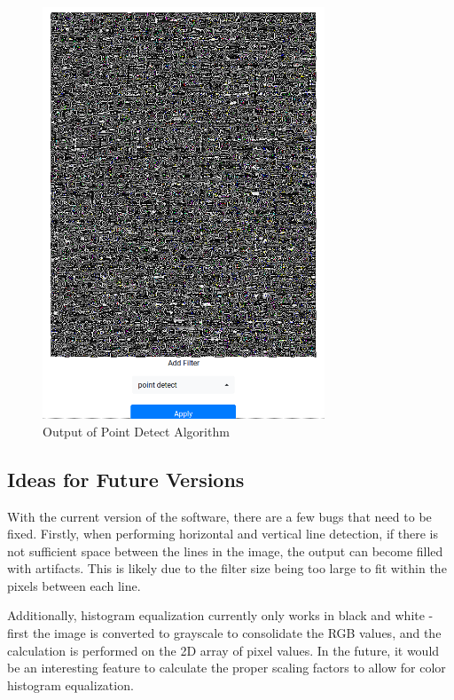 \documentclass{article}
\let\Oldsubsection\subsection
\renewcommand{\subsection}{\FloatBarrier\Oldsubsection}
\begin{document}
  \begin{figure}[!htb]
    \centering
    \includegraphics[width=0.75\textwidth]{assets/point_detect.png}
    \caption{Output of Point Detect Algorithm}
    \label{fig:point-detect-output}
  \end{figure}

  \subsection{Ideas for Future Versions}

  With the current version of the software, there are a few bugs that need to be fixed. Firstly, when performing horizontal and vertical line detection, if there is not sufficient space between the lines in the image, the output can become filled with artifacts. This is likely due to the filter size being too large to fit within the pixels between each line.

  Additionally, histogram equalization currently only works in black and white - first the image is converted to grayscale to consolidate the RGB values, and the calculation is performed on the 2D array of pixel values. In the future, it would be an interesting feature to calculate the proper scaling factors to allow for color histogram equalization.
  
  \newpage

  \printbibliography

  
\end{document}
